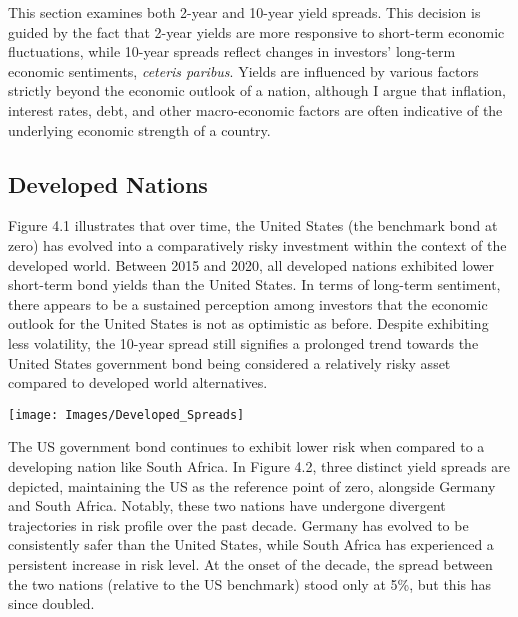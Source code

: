 \documentclass[11pt,preprint, authoryear]{elsarticle}
\let\origfigure\figure
\let\endorigfigure\endfigure
\renewenvironment{figure}[1][2] {
    \expandafter\origfigure\expandafter[H]
} {
    \endorigfigure
}
\numberwithin{equation}{section}
\numberwithin{figure}{section}
\numberwithin{table}{section}
\begin{document}
This section examines both 2-year and 10-year yield spreads. This
decision is guided by the fact that 2-year yields are more responsive to
short-term economic fluctuations, while 10-year spreads reflect changes
in investors' long-term economic sentiments, \emph{ceteris paribus}.
Yields are influenced by various factors strictly beyond the economic
outlook of a nation, although I argue that inflation, interest rates,
debt, and other macro-economic factors are often indicative of the
underlying economic strength of a country.

\hypertarget{developed-nations}{%
\subsection{Developed Nations}\label{developed-nations}}

Figure 4.1 illustrates that over time, the United States (the benchmark
bond at zero) has evolved into a comparatively risky investment within
the context of the developed world. Between 2015 and 2020, all developed
nations exhibited lower short-term bond yields than the United States.
In terms of long-term sentiment, there appears to be a sustained
perception among investors that the economic outlook for the United
States is not as optimistic as before. Despite exhibiting less
volatility, the 10-year spread still signifies a prolonged trend towards
the United States government bond being considered a relatively risky
asset compared to developed world alternatives.

\begin{figure}

{\centering \texttt{[image: Images/Developed\_Spreads]} 

}

\caption{Developed World Bond Yield Spreads \label{Figure4.1}}\label{fig:unnamed-chunk-8}
\end{figure}

The US government bond continues to exhibit lower risk when compared to
a developing nation like South Africa. In Figure 4.2, three distinct
yield spreads are depicted, maintaining the US as the reference point of
zero, alongside Germany and South Africa. Notably, these two nations
have undergone divergent trajectories in risk profile over the past
decade. Germany has evolved to be consistently safer than the United
States, while South Africa has experienced a persistent increase in risk
level. At the onset of the decade, the spread between the two nations
(relative to the US benchmark) stood only at 5\%, but this has since
doubled.
\end{document}
